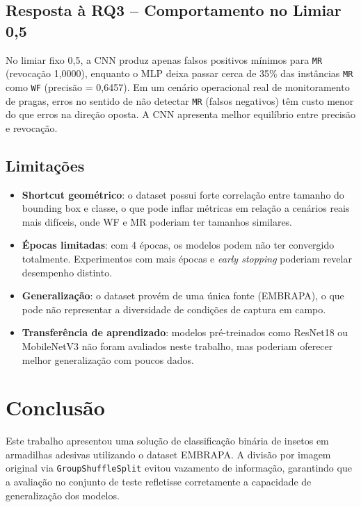 \documentclass[conference]{IEEEtran}
\begin{document}
\subsection{Resposta à RQ3 -- Comportamento no Limiar 0,5}

No limiar fixo 0,5, a CNN produz apenas falsos positivos mínimos
para \texttt{MR} (revocação 1,0000), enquanto o MLP deixa passar
cerca de 35\% das instâncias \texttt{MR} como \texttt{WF}
(precisão = 0,6457). Em um cenário operacional real de monitoramento
de pragas, erros no sentido de não detectar \texttt{MR}
(falsos negativos) têm custo menor do que erros na direção oposta.
A CNN apresenta melhor equilíbrio entre precisão e revocação.

\subsection{Limitações}

\begin{itemize}
    \item \textbf{Shortcut geométrico}: o dataset possui forte
    correlação entre tamanho do bounding box e classe, o que pode
    inflar métricas em relação a cenários reais mais difíceis, onde
    WF e MR poderiam ter tamanhos similares.
    \item \textbf{Épocas limitadas}: com 4 épocas, os modelos podem
    não ter convergido totalmente. Experimentos com mais épocas e
    \textit{early stopping} poderiam revelar desempenho distinto.
    \item \textbf{Generalização}: o dataset provém de uma única fonte
    (EMBRAPA), o que pode não representar a diversidade de condições
    de captura em campo.
    \item \textbf{Transferência de aprendizado}: modelos pré-treinados
    como ResNet18 ou MobileNetV3 não foram avaliados neste trabalho,
    mas poderiam oferecer melhor generalização com poucos dados.
\end{itemize}

\section{Conclusão}

Este trabalho apresentou uma solução de classificação binária de insetos
em armadilhas adesivas utilizando o dataset EMBRAPA. A divisão por imagem
original via \texttt{GroupShuffleSplit} evitou vazamento de informação,
garantindo que a avaliação no conjunto de teste refletisse corretamente
a capacidade de generalização dos modelos.
\end{document}
